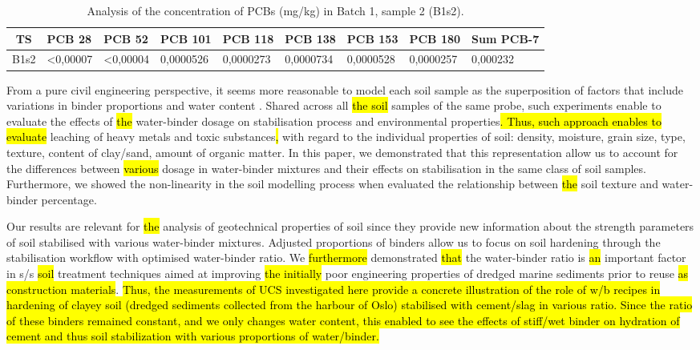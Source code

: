 \documentclass[sustainability,article,submit,pdftex,moreauthors]{Definitions/mdpi}
\begin{document}
\begin{table}[H] 
\caption{Analysis of the concentration of PCBs (mg/kg) in Batch 1, sample 2 (B1s2).\label{tab06}}
\begin{tabularx}{\textwidth}{Cp{1.2cm}p{1.2cm}p{1.2cm}p{1.2cm}p{1.2cm}p{1.2cm}p{1.2cm}p{1.8cm}}
\toprule
\textbf{TS} & \textbf{PCB 28} & \textbf{PCB 52} & \textbf{PCB 101} & \textbf{PCB 118} & \textbf{PCB 138} & \textbf{PCB 153} & \textbf{PCB 180} & \textbf{Sum PCB-7} \\
\midrule
B1s2 & <0,00007 & <0,00004 & 0,0000526 & 0,0000273 & 0,0000734 & 0,0000528 & 0,0000257 & 0,000232 \\
\bottomrule
\end{tabularx}
\end{table}
 
From a pure civil engineering perspective, it seems more reasonable to model each soil sample as the superposition of factors that include variations in binder proportions and water content \cite{Bumanis,HAN2022e01660,HAY2023131529}. Shared across all \hl{the soil }samples of the same\hl{ }probe, such experiments enable to evaluate the effects of \hl{the }water-binder dosage on stabilisation process and environmental properties\hl{. Thus, such approach enables to evaluate }leaching of heavy metals and toxic substances\hl{, }with regard to the individual properties of soil: density, moisture, grain size, type, texture, content of clay/sand, amount of organic matter. In this paper, we demonstrated that this representation allow us to account for the differences between \hl{various }dosage in water-binder mixtures and their effects on stabilisation in the same class of soil samples. Furthermore, we showed the non-linearity in the soil modelling process when evaluated the relationship between \hl{the }soil texture and water-binder percentage. 

Our results are relevant for \hl{the }analysis of geotechnical properties of soil since they provide new information about the strength parameters of soil stabilised with various water-binder mixtures. Adjusted proportions of binders allow us to focus on soil hardening through the stabilisation workflow with optimised water-binder ratio. We \hl{furthermore }demonstrated \hl{that} the water-binder ratio is \hl{an }important factor in s/s \hl{soil }treatment techniques aimed at improving \hl{the initially }poor engineering properties of dredged marine sediments prior to reuse \hl{as construction materials}. \hl{Thus, the measurements of UCS investigated here provide a concrete illustration of the role of w/b recipes in hardening of clayey soil (dredged sediments collected from the harbour of Oslo) stabilised with cement/slag in various ratio. Since the ratio of these binders remained constant, and we only changes water content, this enabled to see the effects of stiff/wet binder on hydration of cement and thus soil stabilization with various proportions of water/binder.} 
\end{document}
